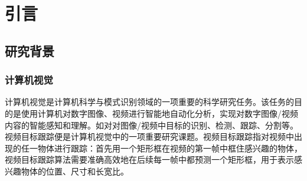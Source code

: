 \chapter{引言}\label{chap:introduction}

\section{研究背景}

\subsection{计算机视觉}
计算机视觉是计算机科学与模式识别领域的一项重要的科学研究任务。该任务的目的是使用计算机对数字图像、视频进行智能地自动化分析，实现对数字图像/视频内容的智能感知和理解。如对对图像/视频中目标的识别、检测、跟踪、分割等。视频目标跟踪便是计算机视觉中的一项重要研究课题。视频目标跟踪指对视频中出现的任一物体进行跟踪：首先用一个矩形框在视频的第一帧中框住感兴趣的物体，视频目标跟踪算法需要准确高效地在后续每一帧中都预测一个矩形框，用于表示感兴趣物体的位置、尺寸和长宽比。

